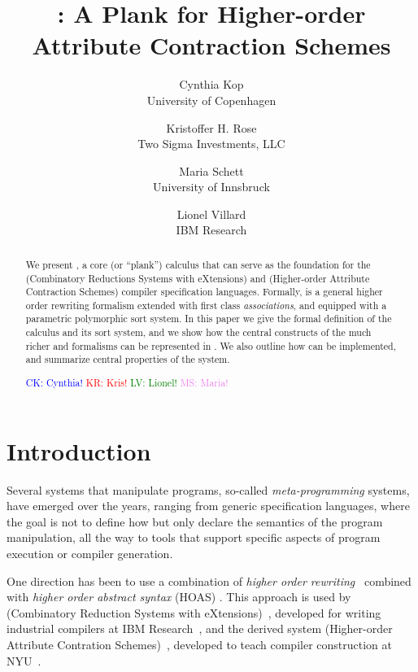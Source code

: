 \documentclass[letterpaper,11pt]{article}
\title{ \hax: A Plank for Higher-order Attribute Contraction Schemes }
\author{%
  Cynthia Kop \\
  University of Copenhagen
  \and
  Kristoffer H. Rose \\
  Two Sigma Investments, LLC
  \and
  Maria Schett \\
  University of Innsbruck
  \and
  Lionel Villard \\
  IBM Research
}
\newcommand{\CK}[1]{\textcolor{blue}{CK: #1}}
\newcommand{\KR}[1]{\textcolor{red}{KR: #1}}
\newcommand{\LV}[1]{\textcolor{green}{LV: #1}}
\newcommand{\MS}[1]{\textcolor{violet}{MS: #1}}
\begin{document}
\maketitle

\begin{abstract}\noindent
  We present \hax, a core (or ``plank'') calculus that can serve as the foundation for the \CRSX
  (Combinatory Reductions Systems with eXtensions) and \HAX (Higher-order Attribute Contraction
  Schemes) compiler specification languages.
  Formally, \hax is a general higher order rewriting formalism extended with first class
  \emph{associations}, and equipped with a parametric polymorphic sort system.
  In this paper we give the formal definition of the \hax calculus and its sort system, and we show
  how the central constructs of the much richer \HAX and \CRSX formalisms can be represented in
  \hax. We also outline how \hax can be implemented, and summarize central properties of the system.

  \CK{Cynthia!} \KR{Kris!} \LV{Lionel!} \MS{Maria!}
\end{abstract}

\compacttableofcontents


\section{Introduction}\label{sec:intro}

Several systems that manipulate programs, so-called \emph{meta-programming} systems, have emerged
over the years, ranging from generic specification languages, where the goal is not to define how
but only declare the semantics of the program manipulation, all the way to tools that support
specific aspects of program execution or compiler generation.

One direction has been to use a combination of \emph{higher order
  rewriting}~\cite{Jouannaud:klop2005} combined with \emph{higher order abstract syntax} (HOAS)
\cite{PfenningElliot:pldi1988}. This approach is used by \CRSX (Combinatory Reduction Systems with
eXtensions)~\cite{Rose:1996}, developed for writing industrial compilers at IBM
Research~\cite{Rose:hor2010,Rose:rta2011,dp60:ibm2013}, and the derived system \HAX (Higher-order
Attribute Contration Schemes)~\cite{Rose:ts2015}, developed to teach compiler construction at
NYU~\cite{RoseRose:cims2015}.
\end{document}
